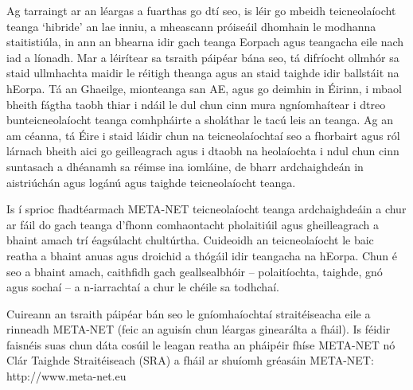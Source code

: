 \documentclass[]{../../metanetpaper}
\begin{document}
\begin{multicols}{2}

Ag tarraingt ar an léargas a fuarthas go dtí seo, is léir go mbeidh teicneolaíocht teanga ‘hibride’ an lae inniu, a mheascann próiseáil dhomhain le modhanna staitistiúla, in ann an bhearna idir gach teanga Eorpach agus teangacha eile nach iad a líonadh. Mar a léirítear sa tsraith páipéar bána seo, tá difríocht ollmhór sa staid ullmhachta maidir le réitigh theanga agus an staid taighde idir ballstáit na hEorpa. Tá an Ghaeilge, mionteanga san AE, agus go deimhin in Éirinn, i mbaol bheith fágtha taobh thiar i ndáil le dul chun cinn mura ngníomhaítear i dtreo bunteicneolaíocht teanga comhpháirte a sholáthar le tacú leis an teanga. Ag an am céanna, tá Éire i staid láidir chun na teicneolaíochtaí seo a fhorbairt agus ról lárnach bheith aici go geilleagrach agus i dtaobh na heolaíochta i ndul chun cinn suntasach a dhéanamh sa réimse ina iomláine, de bharr ardchaighdeán in aistriúchán agus logánú agus taighde teicneolaíocht teanga. 

Is í sprioc fhadtéarmach META-NET teicneolaíocht teanga ardchaighdeáin a chur ar fáil do gach teanga d’fhonn comhaontacht pholaitiúil agus gheilleagrach a bhaint amach trí éagsúlacht chultúrtha. Cuideoidh an teicneolaíocht le baic reatha a bhaint anuas agus droichid a thógáil idir teangacha na hEorpa. Chun é seo a bhaint amach, caithfidh gach geallsealbhóir – polaitíochta, taighde, gnó agus sochaí – a n-iarrachtaí a chur le chéile sa todhchaí.

Cuireann an tsraith páipéar bán seo le gníomhaíochtaí straitéiseacha eile a rinneadh META-NET (feic an aguisín chun léargas ginearálta a fháil). Is féidir faisnéis suas chun dáta cosúil le leagan reatha an pháipéir fhíse META-NET \cite{Meta1} nó Clár Taighde Straitéiseach (SRA) a fháil ar shuíomh gréasáin META-NET:  http://www.meta-net.eu

\end{multicols}

\clearpage


\end{document}
